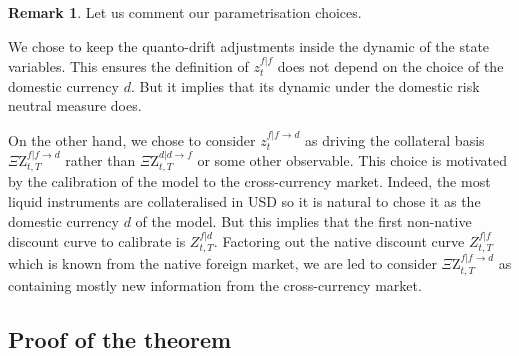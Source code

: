\documentclass[11pt,english]{amsart}
\newcommand{\QZ}{{\Xi\mathrm{Z}}}
\theoremstyle{definition}
\newtheorem{rema}{Remark}
\begin{document}
\begin{rema}
Let us comment our parametrisation choices. 

We chose to keep the quanto-drift adjustments inside the dynamic of the state variables. This ensures the definition of $z^{f|f}_t$ does not depend on the choice of the domestic currency $d$. But it implies that its dynamic under the domestic risk neutral measure does. 

On the other hand, we chose to consider $z^{f|f\to d}_t$ as driving the collateral basis $\QZ^{f|f\to d}_{t,T}$ rather than $\QZ^{d|d\to f}_{t,T}$ or some other observable. This choice is motivated by the calibration of the model to the cross-currency market. Indeed, the most liquid instruments are collateralised in USD so it is natural to chose it as the domestic currency $d$ of the model. But this implies that the first non-native discount curve to calibrate is $Z^{f|d}_{t,T}$. Factoring out the native discount curve $Z^{f|f}_{t,T}$ which is known from the native foreign market, we are led to consider $\QZ^{f|f\to d}_{t,T}$ as containing mostly new information from the cross-currency market.
\end{rema}


\subsection{Proof of the theorem}
\end{document}
